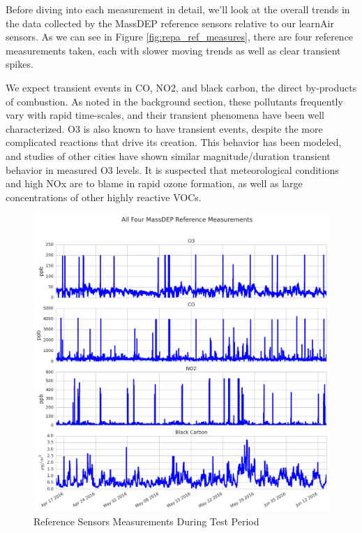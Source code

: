 Before diving into each measurement in detail, we'll look at the overall trends in the data collected by the MassDEP reference sensors relative to our learnAir sensors.  As we can see in Figure \ref{fig:repa_ref_measures}, there are four reference measurements taken, each with slower moving trends as well as clear transient spikes.  

We expect transient events in CO, NO2, and black carbon, the direct by-products of combustion.  As noted in the background section, these pollutants frequently vary with rapid time-scales, and their transient phenomena have been well characterized.  O3 is also known to have transient events, despite the more complicated reactions that drive its creation.  This behavior has been modeled, and studies of other cities have shown similar magnitude/duration transient behavior in measured O3 levels.  It is suspected that meteorological conditions and high NOx are to blame in rapid ozone formation, as well as large concentrations of other highly reactive VOCs.       

\begin{figure}[htb]
 	\includegraphics[width=\textwidth]{figs/epa_ref_measures}               
 	 \caption{Reference Sensors Measurements During Test Period}
  	\label{fig:epa_ref_measures}
\end{figure}

